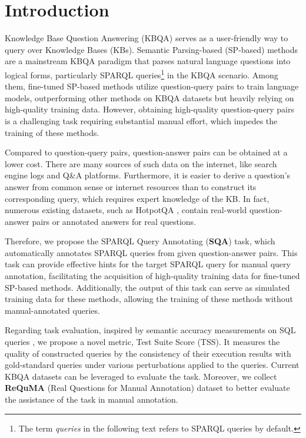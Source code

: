 \documentclass[runningheads]{llncs}
\begin{document}
\section{Introduction}
Knowledge Base Question Answering (KBQA) serves as a user-friendly way to query over Knowledge Bases (KBs).
Semantic Parsing-based (SP-based) methods \cite{berant2013semantic} are a mainstream KBQA paradigm that parses natural language questions into logical forms, particularly SPARQL \cite{perez2009semantics} queries\footnote{The term \textit{queries} in the following text refers to SPARQL queries by default.} in the KBQA scenario. Among them, fine-tuned SP-based methods utilize question-query pairs to train language models, outperforming other methods on KBQA datasets but heavily relying on high-quality training data.
However, obtaining high-quality question-query pairs is a challenging task requiring substantial manual effort, which impedes the training of these methods.

Compared to question-query pairs, question-answer pairs can be obtained at a lower cost.
There are many sources of such data on the internet, like search engine logs and Q\&A platforms.
Furthermore, it is easier to derive a question's answer from common sense or internet resources than to construct its corresponding query, which requires expert knowledge of the KB.
In fact, numerous existing datasets, such as HotpotQA \cite{yang2018hotpotqa}, contain real-world question-answer pairs or annotated answers for real questions.

Therefore, we propose the SPARQL Query Annotating (\textbf{SQA}) task, which automatically annotates SPARQL queries from given question-answer pairs.
This task can provide effective hints for the target SPARQL query for manual query annotation, facilitating the acquisition of high-quality training data for fine-tuned SP-based methods. Additionally, the output of this task can serve as simulated training data for these methods, allowing the training of these methods without manual-annotated queries.
 
Regarding task evaluation, inspired by semantic accuracy measurements on SQL queries \cite{zhong2020semanticsql}, we propose a novel metric, Test Suite Score (TSS). It measures the quality of constructed queries by the consistency of their execution results with gold-standard queries under various perturbations applied to the queries.
Current KBQA datasets can be leveraged to evaluate the task. Moreover, we collect \textbf{ReQuMA} (Real Questions for Manual Annotation) dataset to better evaluate the assistance of the task in manual annotation.
\end{document}
